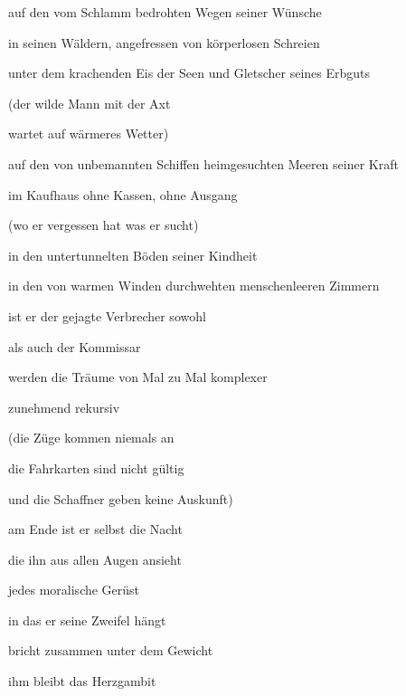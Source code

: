 \documentclass[a4paper]{article}
\begin{document}
auf den vom Schlamm bedrohten Wegen seiner Wünsche


\bigskip

in seinen Wäldern, angefressen von körperlosen Schreien


\bigskip

unter dem krachenden Eis der Seen und Gletscher seines Erbguts


\bigskip

(der wilde Mann mit der Axt

wartet auf wärmeres Wetter)


\bigskip

auf den von unbemannten Schiffen heimgesuchten Meeren seiner Kraft


\bigskip

im Kaufhaus ohne Kassen, ohne Ausgang


\bigskip

(wo er vergessen hat was er sucht)


\bigskip

in den untertunnelten Böden seiner Kindheit


\bigskip

in den von warmen Winden durchwehten menschenleeren Zimmern 


\bigskip

ist er der gejagte Verbrecher sowohl

als auch der Kommissar


\bigskip

werden die Träume von Mal zu Mal komplexer

zunehmend rekursiv


\bigskip

(die Züge kommen niemals an

die Fahrkarten sind nicht gültig

und die Schaffner geben keine Auskunft)


\bigskip


\bigskip


\bigskip

am Ende ist er selbst die Nacht

die ihn aus allen Augen ansieht


\bigskip

jedes moralische Gerüst

in das er seine Zweifel hängt

bricht zusammen unter dem Gewicht


\bigskip

ihm bleibt das Herzgambit
\end{document}
